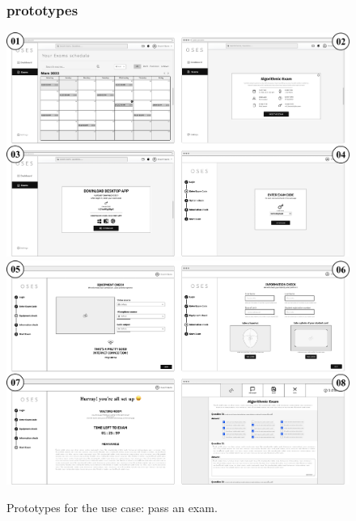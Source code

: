 \documentclass[]{uc2pfecaneva}
\begin{document}
\begin{figure}[h]
	\subsubsection{prototypes}
	\centering
	\includegraphics[width=\textwidth]{images/prototypes_pass_exam1}
	\includegraphics[width=\textwidth]{images/prototypes_pass_exam2}
	
	\caption{Prototypes for the use case: pass an exam.}
\end{figure}
\clearpage
\end{document}
